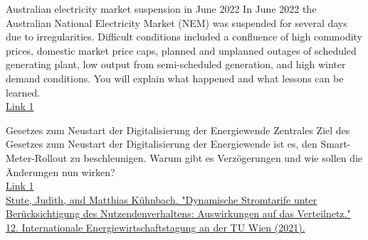 \documentclass[10pt,aspectratio=169,dvipsnames]{beamer}
\begin{document}
\begin{frame}
    \begin{block}{Australian electricity market suspension in June 2022}
    In June 2022 the Australian National Electricity Market (NEM) was suspended for several days due to irregularities. Difficult conditions included a confluence of high commodity prices, domestic market price caps, planned and unplanned outages of scheduled generating plant, low output from semi-scheduled generation, and high winter demand conditions. You will explain what happened and what lessons can be learned.\\
    \href{https://www.aemo.com.au/-/media/files/electricity/nem/market_notices_and_events/market_event_reports/2022/nem-market-suspension-and-operational-challenges-in-june-2022.pdf}{Link 1}
    \end{block}
    \begin{block}{Gesetzes zum Neustart der Digitalisierung der Energiewende}
    Zentrales Ziel des Gesetzes zum Neustart der Digitalisierung der Energiewende ist es, den Smart-Meter-Rollout zu beschleunigen. Warum gibt es Verzögerungen und wie sollen die Änderungen nun wirken?\\
    \href{https://dserver.bundestag.de/btd/20/064/2006457.pdf}{Link 1}\\
    \href{https://www.gesetze-im-internet.de/messbg/}{Stute, Judith, and Matthias Kühnbach. "Dynamische Stromtarife unter Berücksichtigung des Nutzendenverhaltens: Auswirkungen auf das Verteilnetz." 12. Internationale Energiewirtschaftstagung an der TU Wien (2021).}
    \end{block}
\end{frame}
\end{document}
